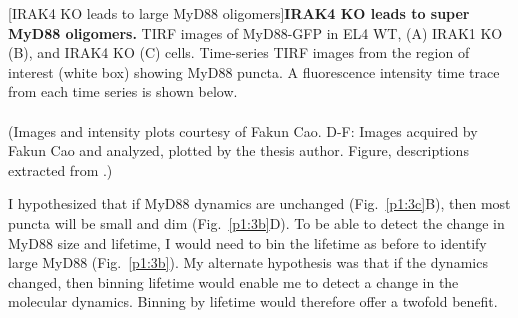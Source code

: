 \begin{centering}
\captionsetup{parbox=none}
[IRAK4 KO leads to large MyD88 oligomers]{\textbf{IRAK4 KO leads to super MyD88 oligomers.} TIRF images of MyD88-GFP in EL4 WT, (A) IRAK1 KO (B), and IRAK4 KO (C) cells. Time-series TIRF images from the region of interest (white box) showing MyD88 puncta. A fluorescence intensity time trace from each time series is shown below.
\\
\\
(Images and intensity plots courtesy of Fakun Cao. D-F: Images acquired by Fakun Cao and analyzed, plotted by the thesis author. Figure, descriptions extracted from \autocite{Deliz-Aguirre_2021}.)}
\label{p1:6a}
\end{centering}

I hypothesized that if MyD88 dynamics are unchanged (Fig.~\ref{p1:3c}B), then most puncta will be small and dim (Fig.~\ref{p1:3b}D). To be able to detect the change in MyD88 size and lifetime, I would need to bin the lifetime as before to identify large MyD88 (Fig.~\ref{p1:3b}). My alternate hypothesis was that if the dynamics changed, then binning lifetime would enable me to detect a change in the molecular dynamics. Binning by lifetime would therefore offer a twofold benefit.

